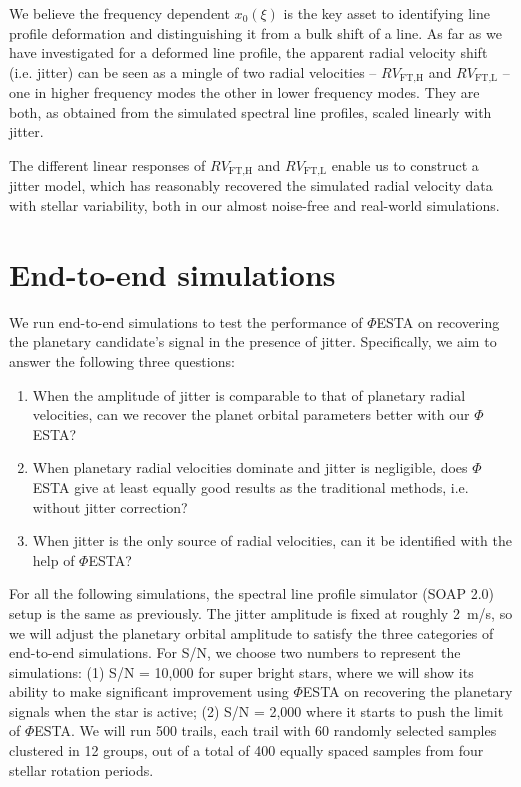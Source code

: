 We believe the frequency dependent $x_0(\xi)$ is the key asset to identifying line profile deformation and distinguishing it from a bulk shift of a line. As far as we have investigated for a deformed line profile, the apparent radial velocity shift (i.e. jitter) can be seen as a mingle of two radial velocities -- $RV_\text{FT,H}$ and $RV_\text{FT,L}$ -- one in higher frequency modes the other in lower frequency modes. They are both, as obtained from the simulated spectral line profiles, scaled linearly with jitter. 

The different linear responses of $RV_\text{FT,H}$ and $RV_\text{FT,L}$ enable us to construct a jitter model, which has reasonably recovered the simulated radial velocity data with stellar variability, both in our almost noise-free and real-world simulations. 

\pagebreak
\section{End-to-end simulations}
\label{\thesection}
\label{sec:end-to-end}

We run end-to-end simulations to test the performance of $\mathit{\Phi}$ESTA on recovering the planetary candidate's signal in the presence of jitter. Specifically, we aim to answer the following three questions:
\begin{enumerate}
	\item When the amplitude of jitter is comparable to that of planetary radial velocities, can we recover the planet orbital parameters better with our $\mathit{\Phi}$ESTA? 
	\item When planetary radial velocities dominate and jitter is negligible, does $\mathit{\Phi}$ESTA give at least equally good results as the traditional methods, i.e. without jitter correction? 
	\item When jitter is the only source of radial velocities, can it be identified with the help of $\mathit{\Phi}$ESTA?
\end{enumerate}

For all the following simulations, the spectral line profile simulator (SOAP 2.0) setup is the same as previously. The jitter amplitude is fixed at roughly 2~m/s, so we will adjust the planetary orbital amplitude to satisfy the three categories of end-to-end simulations. For S/N, we choose two numbers to represent the simulations: (1) S/N = 10,000 for super bright stars, where we will show its ability to make significant improvement using $\mathit{\Phi}$ESTA on recovering the planetary signals when the star is active; (2) S/N = 2,000 where it starts to push the limit of $\mathit{\Phi}$ESTA. We will run 500 trails, each trail with 60 randomly selected samples clustered in 12 groups, out of a total of 400 equally spaced samples from four stellar rotation periods. 

